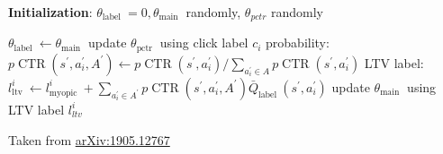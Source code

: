 \documentclass{article}
\begin{document}
\begin{algorithmic}[1]
    \State \textbf{Initialization}: $\theta_{\text {label }}=0, \theta_{\text {main }}$ randomly, $\theta_{p c t r}$ randomly

            \State $\theta_{\text {label }} \gets \theta_{\text {main }}$
        \EndIf
                \State update $\theta_{\text {pctr }}$ using click label $c_i$
                    \State probability: $p \operatorname{CTR}\left(s^{\prime}, a_i^{\prime}, A^{\prime}\right) \leftarrow p \operatorname{CTR}\left(s^{\prime}, a_i^{\prime}\right) / \sum_{a_i^{\prime} \in A} p\operatorname{CTR}\left(s^{\prime}, a_i^{\prime}\right)$
                    \State LTV label: $l_{\text {ltv }}^i \leftarrow l_{\text {myopic }}^i+\sum_{a_i^{\prime} \in A^{\prime}} p \operatorname{CTR}\left(s^{\prime}, a_i^{\prime}, A^{\prime}\right) \bar{Q}_{\text {label }}\left(s^{\prime}, a_i^{\prime}\right)$
                    \State update $\theta_{\text {main }}$ using LTV label $l_{l t v}^i$
                \EndIf  
            \EndFor
        \EndFor
    \EndFor
\end{algorithmic}
\vfill
Taken from \href{https://arxiv.org/abs/1905.12767}{arXiv:1905.12767}
\end{document}
